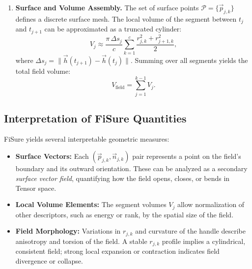\begin{enumerate}
            \item \textbf{Surface and Volume Assembly.}  
                The set of surface points 
                \(\mathcal{P} = \{\vec{p}_{j,k}\} \) defines a discrete 
                surface mesh.  
                The local volume of the segment between 
                \(t_j\) and \(t_{j+1}\) can be approximated as a truncated cylinder:
                \[
                    V_j \approx 
                    \frac{\pi \, \Delta s_j}{c}
                    \sum_{k=1}^{c}
                    \frac{r_{j,k}^{2} + r_{j+1,k}^{2}}{2},
                \]
                where \(\Delta s_j = \|\vec{h}(t_{j+1}) - \vec{h}(t_j)\|\).
                Summing over all segments yields the total field volume:
                \[
                    V_{\text{field}} = \sum_{j=1}^{k-1} V_j.
                \]
        \end{enumerate}

    \subsection{Interpretation of FiSure Quantities}

        FiSure yields several interpretable geometric measures:

        \begin{itemize}
            \item \textbf{Surface Vectors:}  
                  Each \((\vec{p}_{j,k}, \vec{n}_{j,k})\) pair represents a point on the 
                  field’s boundary and its outward orientation.  
                  These can be analyzed as a secondary \textit{surface vector field}, 
                  quantifying how the field opens, closes, or bends in Tensor space.

            \item \textbf{Local Volume Elements:}  
                  The segment volumes \(V_j\) allow normalization of other descriptors, 
                  such as energy or rank, by the spatial size of the field.

            \item \textbf{Field Morphology:}  
                  Variations in \(r_{j,k}\) and curvature of the handle describe 
                  anisotropy and torsion of the field.  
                  A stable \(r_{j,k}\) profile implies a cylindrical, consistent field; 
                  strong local expansion or contraction indicates field divergence or collapse.
        \end{itemize}

